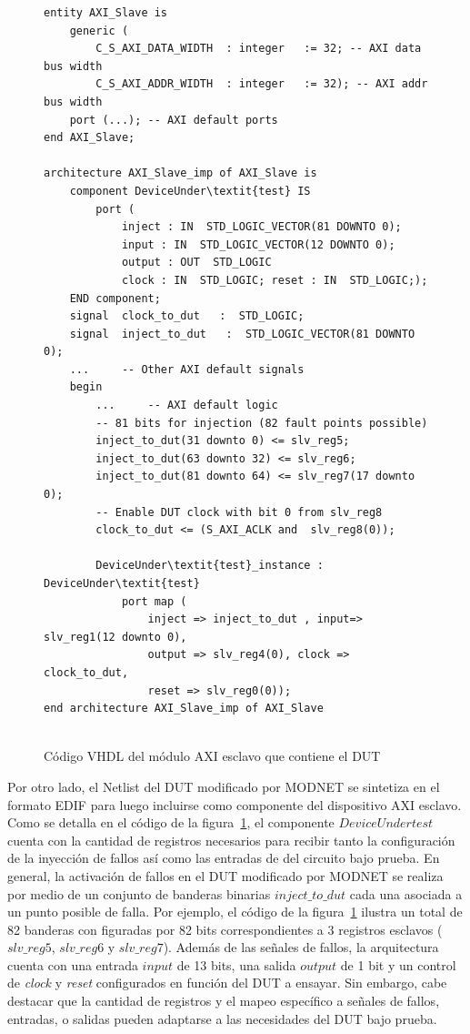 \documentclass[a4paper,openright,12pt]{report}
\begin{document}
\begin{figure}[H]
\centering
\begin{lstlisting}
entity AXI_Slave is 
	generic (
		C_S_AXI_DATA_WIDTH	: integer	:= 32; -- AXI data bus width
		C_S_AXI_ADDR_WIDTH	: integer	:= 32); -- AXI addr bus width
	port (...); -- AXI default ports
end AXI_Slave;

architecture AXI_Slave_imp of AXI_Slave is
	component DeviceUnder\textit{test} IS
		port (
			inject : IN  STD_LOGIC_VECTOR(81 DOWNTO 0);
			input : IN  STD_LOGIC_VECTOR(12 DOWNTO 0);
			output : OUT  STD_LOGIC
			clock : IN  STD_LOGIC; reset : IN  STD_LOGIC;);
	END component;
	signal  clock_to_dut   :  STD_LOGIC;
	signal  inject_to_dut   :  STD_LOGIC_VECTOR(81 DOWNTO 0);
	... 	-- Other AXI default signals
	begin
		... 	-- AXI default logic
		-- 81 bits for injection (82 fault points possible)
		inject_to_dut(31 downto 0) <= slv_reg5;
		inject_to_dut(63 downto 32) <= slv_reg6;
		inject_to_dut(81 downto 64) <= slv_reg7(17 downto 0);
		-- Enable DUT clock with bit 0 from slv_reg8
		clock_to_dut <= (S_AXI_ACLK and  slv_reg8(0)); 
		
		DeviceUnder\textit{test}_instance : DeviceUnder\textit{test}	
			port map (
				inject => inject_to_dut , input=>  slv_reg1(12 downto 0), 
				output => slv_reg4(0), clock => clock_to_dut, 
				reset => slv_reg0(0));			
end architecture AXI_Slave_imp of AXI_Slave
		
\end{lstlisting}
	\caption{Código VHDL del módulo AXI esclavo que contiene el DUT}
	\label{axi_slave}
\end{figure}

Por otro lado, el Netlist del DUT modificado por MODNET se sintetiza en el formato EDIF para luego incluirse como componente del dispositivo AXI esclavo. Como se detalla en el código de la figura~\ref{axi_slave}, el componente $DeviceUnder\textit{test}$ cuenta con la cantidad de registros necesarios para recibir tanto la configuración de la inyección de fallos así como las entradas de del circuito bajo prueba. En general, la activación de fallos en el DUT modificado por MODNET se realiza por medio de un conjunto de banderas binarias $inject\_to\_dut$ cada una asociada a un punto posible de falla. Por ejemplo, el código de la figura~\ref{axi_slave} ilustra un total de 82 banderas con figuradas por 82 bits correspondientes a 3 registros esclavos ($slv\_reg5$, $slv\_reg6$ y $slv\_reg7$). Además de las señales de fallos, la arquitectura cuenta con una entrada $input$ de 13 bits, una salida $output$ de 1 bit y un control de \textit{clock} y \textit{reset} configurados en función del DUT a ensayar. Sin embargo, cabe destacar que la cantidad de registros y el mapeo específico a señales de fallos, entradas, o salidas  pueden adaptarse a las necesidades del DUT bajo prueba. 
\end{document}
